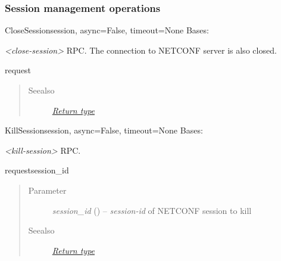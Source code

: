 \documentclass[a4paper,10pt,english]{manual}
\begin{document}
\subsubsection{Session management operations}

\hypertarget{ncclient.operations.CloseSession}{}\begin{classdesc}{CloseSession}{session, async=False, timeout=None}
Bases: \hyperlink{ncclient.operations.rpc.RPC}{}

\emph{\textless{}close-session\textgreater{}} RPC. The connection to NETCONF server is also closed.

\hypertarget{ncclient.operations.CloseSession.request}{}\begin{methoddesc}{request}{}~\begin{quote}\begin{description}
\item[Seealso]
\hyperlink{return}{\emph{Return type}}

\end{description}\end{quote}
\end{methoddesc}
\end{classdesc}

\hypertarget{ncclient.operations.KillSession}{}\begin{classdesc}{KillSession}{session, async=False, timeout=None}
Bases: \hyperlink{ncclient.operations.rpc.RPC}{}

\emph{\textless{}kill-session\textgreater{}} RPC.

\hypertarget{ncclient.operations.KillSession.request}{}\begin{methoddesc}{request}{session\_id}~\begin{quote}\begin{description}
\item[Parameter]
\emph{session\_id} (\href{http://docs.python.org/library/string.html\#string}{}) -- \emph{session-id} of NETCONF session to kill

\item[Seealso]
\hyperlink{return}{\emph{Return type}}

\end{description}\end{quote}
\end{methoddesc}
\end{classdesc}
\end{document}
